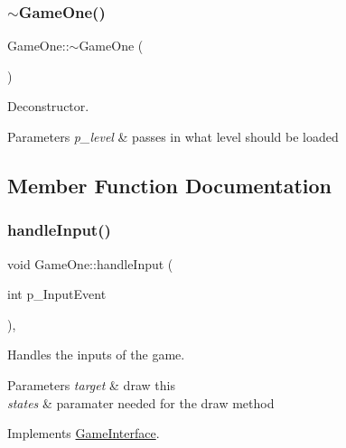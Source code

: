 \subsubsection{\texorpdfstring{$\sim$\+Game\+One()}{~GameOne()}}
{\footnotesize\ttfamily Game\+One\+::$\sim$\+Game\+One (\begin{DoxyParamCaption}{ }\end{DoxyParamCaption})}



Deconstructor. 


\begin{DoxyParams}{Parameters}
{\em p\+\_\+level} & passes in what level should be loaded \\
\hline
\end{DoxyParams}


\subsection{Member Function Documentation}
\mbox{\label{class_game_one_ae1ecd54039b4a3650f0d113ef4629da3}} 
\subsubsection{\texorpdfstring{handle\+Input()}{handleInput()}}
{\footnotesize\ttfamily void Game\+One\+::handle\+Input (\begin{DoxyParamCaption}\item[{int}]{p\+\_\+\+Input\+Event }\end{DoxyParamCaption})\hspace{0.3cm}{\ttfamily [override]}, {\ttfamily [virtual]}}



Handles the inputs of the game. 


\begin{DoxyParams}{Parameters}
{\em target} & draw this \\
\hline
{\em states} & paramater needed for the draw method \\
\hline
\end{DoxyParams}


Implements \mbox{\hyperlink{class_game_interface_a48b4f6059c14c79359d30b77016a28f0}{Game\+Interface}}.

\mbox{\label{class_game_one_a9e9050de230336fac769ab5e8b23f7f8}} 
